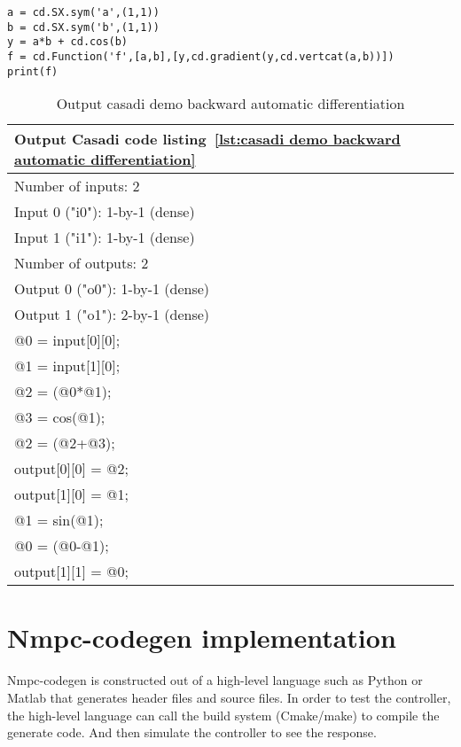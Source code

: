 \begin{lstlisting}[caption={Casadi code example automatic backward differentiation},label={lst:casadi demo backward automatic differentiation}]
a = cd.SX.sym('a',(1,1))
b = cd.SX.sym('b',(1,1))
y = a*b + cd.cos(b)
f = cd.Function('f',[a,b],[y,cd.gradient(y,cd.vertcat(a,b))])
print(f)
\end{lstlisting}

\begin{table}
	\begin{center}
		\begin{tabular}{ |l|  }
			\hline
			Output Casadi code listing~\ref{lst:casadi demo backward automatic differentiation} \\
			\hline
			Number of inputs: 2 \\
			Input 0 ("i0"): 1-by-1 (dense) \\
			Input 1 ("i1"): 1-by-1 (dense) \\
			Number of outputs: 2 \\
			Output 0 ("o0"): 1-by-1 (dense) \\
			Output 1 ("o1"): 2-by-1 (dense) \\
			@0 = input[0][0]; \\
			@1 = input[1][0]; \\
			@2 = (@0*@1); \\
			@3 = cos(@1); \\
			@2 = (@2+@3); \\
			output[0][0] = @2; \\
			output[1][0] = @1; \\
			@1 = sin(@1); \\
			@0 = (@0-@1); \\
			output[1][1] = @0; \\
			\hline   
		\end{tabular}
		\caption{Output casadi demo backward automatic differentiation}
		\label{tbl:output casadi demo backward automatic differentiation}
	\end{center}
\end{table}


\section{Nmpc-codegen implementation}
Nmpc-codegen is constructed out of a high-level language such as Python or Matlab that generates header files and source files. In order to test the controller, the high-level language can call the build system (Cmake/make) to compile the generate code. And then simulate the controller to see the response.

